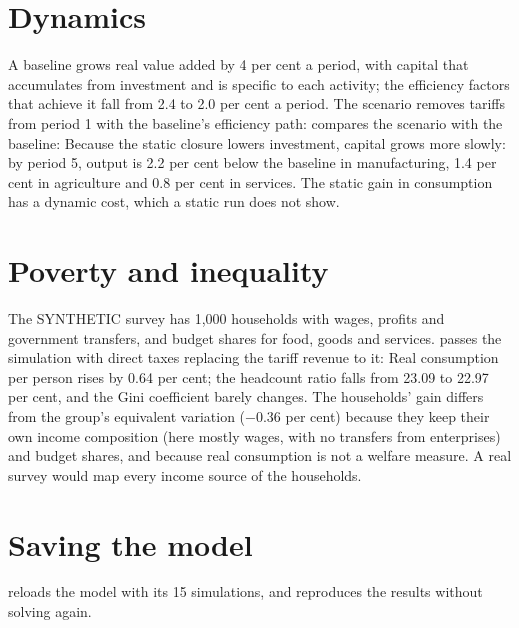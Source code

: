 \section{Dynamics}

A baseline grows real value added by 4 per cent a period, with capital that
accumulates from investment and is specific to each activity; the efficiency
factors that achieve it fall from 2.4 to 2.0 per cent a period. The scenario
removes tariffs from period 1 with the baseline's efficiency path:
 compares the scenario with the baseline:
Because the static closure lowers investment, capital grows more slowly: by
period 5, output is 2.2 per cent below the baseline in manufacturing, 1.4 per
cent in agriculture and 0.8 per cent in services. The static gain in
consumption has a dynamic cost, which a static run does not show.

\section{Poverty and inequality}

The SYNTHETIC survey has 1,000 households with wages, profits and government
transfers, and budget shares for food, goods and services. 
passes the simulation with direct taxes replacing the tariff revenue to it:
Real consumption per person rises by 0.64 per cent; the headcount ratio falls
from 23.09 to 22.97 per cent, and the Gini coefficient barely changes. The
households' gain differs from the group's equivalent variation ($-0.36$ per
cent) because they keep their own income composition (here mostly wages, with
no transfers from enterprises) and budget shares, and because real
consumption is not a welfare measure. A real survey would map every income
source of the households.

\section{Saving the model}

 reloads the model with its 15 simulations, and
 reproduces the results without solving again.
